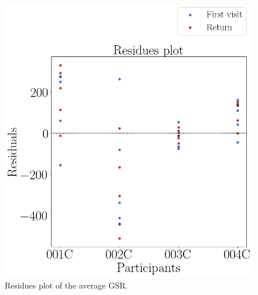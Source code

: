 \begin{figure}[!htb]
\begin{minipage}{0.45\linewidth}
            \includegraphics[width = \linewidth]{Resultados/GSR/Figuras/png/residplot_gsr_avg.png}
            \caption{Residues plot of the average GSR.}
            \label{fig:residual_gsr_avg}
        \end{minipage}
    \end{figure}

\FloatBarrier

%
%
